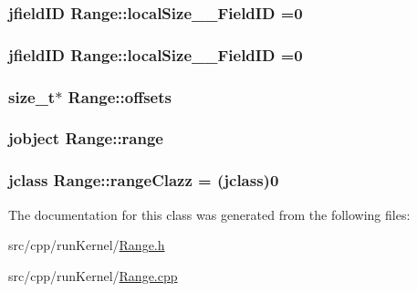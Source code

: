 \hypertarget{class_range_ab3d0d224e0ab935c43b535fde397ec5c}{
\subsubsection[{local\-Size\-\_\-1\-\_\-\-Field\-I\-D}]{\setlength{\rightskip}{0pt plus 5cm}jfield\-I\-D Range\-::local\-Size\-\_\-\_\-\-Field\-I\-D =0\hspace{0.3cm}{\ttfamily [static]}}}\label{class_range_ab3d0d224e0ab935c43b535fde397ec5c}
\hypertarget{class_range_a144ef7e53d688f179c52403849b99136}{
\subsubsection[{local\-Size\-\_\-2\-\_\-\-Field\-I\-D}]{\setlength{\rightskip}{0pt plus 5cm}jfield\-I\-D Range\-::local\-Size\-\_\-\_\-\-Field\-I\-D =0\hspace{0.3cm}{\ttfamily [static]}}}\label{class_range_a144ef7e53d688f179c52403849b99136}
\hypertarget{class_range_a66dc18cc0c4e4b72c0cc33fa93fbb9d1}{
\subsubsection[{offsets}]{\setlength{\rightskip}{0pt plus 5cm}size\-\_\-t$\ast$ Range\-::offsets}}\label{class_range_a66dc18cc0c4e4b72c0cc33fa93fbb9d1}
\hypertarget{class_range_a08ece25fa240f3740da132631ea7094d}{
\subsubsection[{range}]{\setlength{\rightskip}{0pt plus 5cm}jobject Range\-::range}}\label{class_range_a08ece25fa240f3740da132631ea7094d}
\hypertarget{class_range_a8d141ea107728b2e312952cf0824b103}{
\subsubsection[{range\-Clazz}]{\setlength{\rightskip}{0pt plus 5cm}jclass Range\-::range\-Clazz = (jclass)0\hspace{0.3cm}{\ttfamily [static]}}}\label{class_range_a8d141ea107728b2e312952cf0824b103}


The documentation for this class was generated from the following files\-:\begin{DoxyCompactItemize}
\item 
src/cpp/run\-Kernel/\hyperlink{_range_8h}{Range.\-h}\item 
src/cpp/run\-Kernel/\hyperlink{_range_8cpp}{Range.\-cpp}\end{DoxyCompactItemize}
